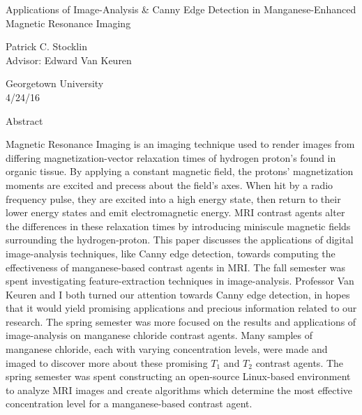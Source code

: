 \documentclass[a4paper,12pt]{article}
\begin{document}
	\begin{center}
	\vspace{0.5cm}
	\huge{Applications of Image-Analysis \& Canny Edge Detection in Manganese-Enhanced Magnetic Resonance Imaging}\\
	\vspace{0.5cm}

	\singlespacing
	\small{Patrick C. Stocklin}\\

	\small{Advisor: Edward Van Keuren}

	\small{Georgetown University}\\

	\small{4/24/16}\\
	\end{center}

\begin{section}{Abstract}
\singlespacing

Magnetic Resonance Imaging is an imaging technique used to render images from differing magnetization-vector relaxation times of hydrogen proton's found in organic tissue. By applying a constant magnetic field, the protons' magnetization moments are excited and precess about the field's axes. When hit by a radio frequency pulse, they are excited into a high energy state, then return to their lower energy states and emit electromagnetic energy. MRI contrast agents alter the differences in these relaxation times by introducing miniscule magnetic fields surrounding the hydrogen-proton. This paper discusses the applications of digital image-analysis techniques, like Canny edge detection, towards computing the effectiveness of manganese-based contrast agents in MRI. The fall semester was spent investigating feature-extraction techniques in image-analysis. Professor Van Keuren and I both turned our attention towards Canny edge detection, in hopes that it would yield promising applications and precious information related to our research. The spring semester was more focused on the results and applications of image-analysis on manganese chloride contrast agents. Many samples of manganese chloride, each with varying concentration levels, were made and imaged to discover more about these promising $T_1$ and $T_2$ contrast agents. The spring semester was spent constructing an open-source Linux-based environment to analyze MRI images and create algorithms which determine the most effective concentration level for a manganese-based contrast agent.


\end{section}
\end{document}
